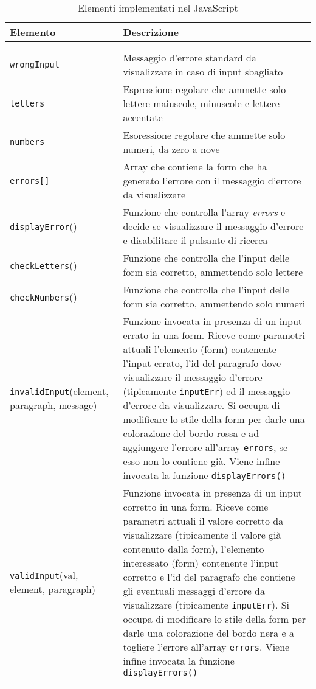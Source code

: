 \begin{center}
	\begin{longtable}{| m{} | m{} |} \hline
	\rowcolor{red!50!blue!40!white}
	\textbf{Elemento}&\textbf{Descrizione}\\ \hline 
	\endfirsthead
	\rowcolor{white}
	\multicolumn{2}{|r|}{\textit{-- continuazione da pagina precedente}} \\ \hline 
	\endhead
	\hline
	\rowcolor{white} 
	\multicolumn{2}{|r|}{{\textit{-- continua a pagina successiva}}} \\
	\endfoot
	\endlastfoot
	\texttt{wrongInput} & Messaggio d'errore standard da visualizzare in caso di input sbagliato\\ 
	\texttt{letters} & Espressione regolare che ammette solo lettere maiuscole, minuscole e lettere accentate\\
	\texttt{numbers} & Esoressione regolare che ammette solo numeri, da zero a nove\\
	\texttt{errors[]} & Array che contiene la form che ha generato l'errore con il messaggio d'errore da visualizzare\\
	\texttt{displayError}() & Funzione che controlla l'array \textit{errors} e decide se visualizzare il messaggio d'errore e disabilitare il pulsante di ricerca\\
	\texttt{checkLetters}() & Funzione che controlla che l'input delle form sia corretto, ammettendo solo lettere\\
	\texttt{checkNumbers}() & Funzione che controlla che l'input delle form sia corretto, ammettendo solo numeri\\
	\texttt{invalidInput}(element, paragraph, message) & Funzione invocata in presenza di un input errato in una form. Riceve come parametri attuali l'elemento (form) contenente l'input errato, l'id del paragrafo dove visualizzare il messaggio d'errore (tipicamente \texttt{inputErr}) ed il messaggio d'errore da visualizzare. Si occupa di modificare lo stile della form per darle una colorazione del bordo rossa e ad aggiungere l'errore all'array \texttt{errors}, se esso non lo contiene già. Viene infine invocata la funzione \texttt{displayErrors()}\\
	\texttt{validInput}(val, element, paragraph) & Funzione invocata in presenza di un input corretto in una form. Riceve come parametri attuali il valore corretto da visualizzare (tipicamente il valore già contenuto dalla form), l'elemento interessato (form) contenente l'input corretto e l'id del paragrafo che contiene gli eventuali messaggi d'errore da visualizzare (tipicamente \texttt{inputErr}). Si occupa di modificare lo stile della form per darle una colorazione del bordo nera e a togliere l'errore all'array \texttt{errors}. Viene infine invocata la funzione \texttt{displayErrors()}\\ \hline
	\rowcolor{white}
	\caption{Elementi implementati nel JavaScript}
	\end{longtable}
\end{center} 
